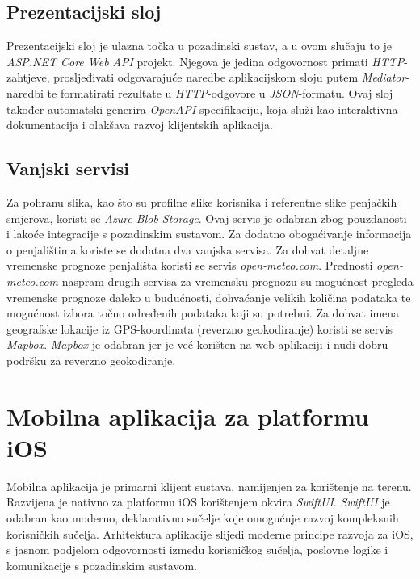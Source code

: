 \subsection{Prezentacijski sloj}

Prezentacijski sloj je ulazna točka u pozadinski sustav, a u ovom slučaju to je \textit{ASP.NET Core Web API} projekt. Njegova je jedina odgovornost primati \textit{HTTP}-zahtjeve, prosljeđivati odgovarajuće naredbe aplikacijskom sloju putem \textit{Mediator}-naredbi te formatirati rezultate u \textit{HTTP}-odgovore u \textit{JSON}-formatu. Ovaj sloj također automatski generira \textit{OpenAPI}-specifikaciju, koja služi kao interaktivna dokumentacija i olakšava razvoj klijentskih aplikacija.


\subsection{Vanjski servisi}

Za pohranu slika, kao što su profilne slike korisnika i referentne slike penjačkih smjerova, koristi se \textit{Azure Blob Storage}. Ovaj servis je odabran zbog pouzdanosti i lakoće integracije s pozadinskim sustavom. Za dodatno obogaćivanje informacija o penjalištima koriste se dodatna dva vanjska servisa. Za dohvat detaljne vremenske prognoze penjališta koristi se servis \textit{open-meteo.com}. Prednosti \textit{open-meteo.com} naspram drugih servisa za vremensku prognozu su mogućnost pregleda vremenske prognoze daleko u budućnosti, dohvaćanje velikih količina podataka te mogućnost izbora točno određenih podataka koji su potrebni. Za dohvat imena geografske lokacije iz GPS-koordinata (reverzno geokodiranje) koristi se servis \textit{Mapbox}. \textit{Mapbox} je odabran jer je već korišten na web-aplikaciji i nudi dobru podršku za reverzno geokodiranje.

\section{Mobilna aplikacija za platformu iOS}

Mobilna aplikacija je primarni klijent sustava, namijenjen za korištenje na terenu. Razvijena je nativno za platformu iOS korištenjem okvira \textit{SwiftUI}. \textit{SwiftUI} je odabran kao moderno, deklarativno sučelje koje omogućuje razvoj kompleksnih korisničkih sučelja. Arhitektura aplikacije slijedi moderne principe razvoja za iOS, s jasnom podjelom odgovornosti između korisničkog sučelja, poslovne logike i komunikacije s pozadinskim sustavom. 

